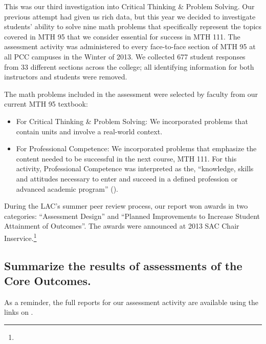 \begin{description}
	This was our third investigation into Critical Thinking \& Problem Solving.  Our previous attempt had given
	us rich data, but this year we decided to investigate students' ability to solve
	nine math problems that specifically represent the topics covered in MTH 95 that
	we consider essential for success in MTH 111.  The assessment activity was
	administered to every face-to-face section of MTH 95 at all PCC campuses in the
	Winter of 2013.  We collected 677 student responses from 33 different sections
	across the college; all identifying information for both instructors and
	students were removed.

	The math problems included in the assessment were selected by faculty from our
	current MTH 95 textbook:
	\begin{itemize}
		\item For Critical Thinking \& Problem Solving: We incorporated problems that contain units and involve a
		real-world context.
		\item For Professional Competence:  We incorporated problems that emphasize the content needed to be
		successful in the next course, MTH 111.  For this activity, Professional
		Competence was interpreted as the, ``knowledge, skills and attitudes necessary
		to enter and succeed in a defined profession or advanced academic program''
		(\cite{coreoutcomes}).
	\end{itemize}
	During the LAC's summer peer review process, our report won awards in two
	categories: ``Assessment Design'' and ``Planned Improvements to Increase Student
	Attainment of Outcomes''.  The awards were announced at 2013 SAC Chair
	Inservice.\footnote{\awardsurl}
\end{description}

\subsection[Core outcome assessment results]{Summarize the results of assessments of the Core Outcomes.}
As a reminder, the full reports for our assessment activity are available using
the links on .

